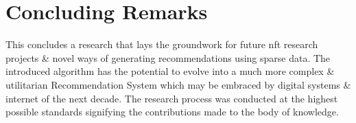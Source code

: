 \section{Concluding Remarks}
This concludes a research that lays the groundwork for future \gls{nft} research projects \& novel ways of generating recommendations using sparse data. The introduced algorithm has the potential to evolve into a much more complex \& utilitarian Recommendation System which may be embraced by digital systems \& internet of the next decade.
The research process was conducted at the highest possible standards signifying the contributions made to the body of knowledge.